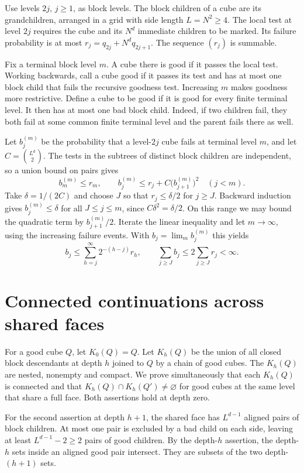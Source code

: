 \documentclass[11pt]{amsart}
\begin{document}
Use levels $2j$, $j\ge1$, as block levels. The block children of a cube are its grandchildren, arranged in a grid with side length $L=N^2\ge4$. The local test at level $2j$ requires the cube and its $N^d$ immediate children to be marked. Its failure probability is at most $r_j=q_{2j}+N^d q_{2j+1}$. The sequence $(r_j)$ is summable.

Fix a terminal block level $m$. A cube there is good if it passes the local test. Working backwards, call a cube good if it passes its test and has at most one block child that fails the recursive goodness test. Increasing $m$ makes goodness more restrictive. Define a cube to be good if it is good for every finite terminal level. It then has at most one bad block child. Indeed, if two children fail, they both fail at some common finite terminal level and the parent fails there as well.

Let $b_j^{(m)}$ be the probability that a level-$2j$ cube fails at terminal level $m$, and let $C=\binom{L^d}{2}$. The tests in the subtrees of distinct block children are independent, so a union bound on pairs gives
\[
 b_m^{(m)}\le r_m,\qquad
 b_j^{(m)}\le r_j+C\bigl(b_{j+1}^{(m)}\bigr)^2\quad(j<m).
\]
Take $\delta=1/(2C)$ and choose $J$ so that $r_j\le\delta/2$ for $j\ge J$. Backward induction gives $b_j^{(m)}\le\delta$ for all $J\le j\le m$, since $C\delta^2=\delta/2$. On this range we may bound the quadratic term by $b_{j+1}^{(m)}/2$. Iterate the linear inequality and let $m\to\infty$, using the increasing failure events. With $b_j=\lim_m b_j^{(m)}$ this yields
\begin{equation}\label{eq:sum}
 b_j\le\sum_{h=j}^{\infty}2^{-(h-j)}r_h,
 \qquad \sum_{j\ge J} b_j\le 2\sum_{j\ge J}r_j<\infty.
\end{equation}

\section{Connected continuations across shared faces}
For a good cube $Q$, let $K_0(Q)=Q$. Let $K_h(Q)$ be the union of all closed block descendants at depth $h$ joined to $Q$ by a chain of good cubes. The $K_h(Q)$ are nested, nonempty and compact. We prove simultaneously that each $K_h(Q)$ is connected and that $K_h(Q)\cap K_h(Q')\ne\varnothing$ for good cubes at the same level that share a full face. Both assertions hold at depth zero.

For the second assertion at depth $h+1$, the shared face has $L^{d-1}$ aligned pairs of block children. At most one pair is excluded by a bad child on each side, leaving at least $L^{d-1}-2\ge2$ pairs of good children. By the depth-$h$ assertion, the depth-$h$ sets inside an aligned good pair intersect. They are subsets of the two depth-$(h+1)$ sets.
\end{document}
